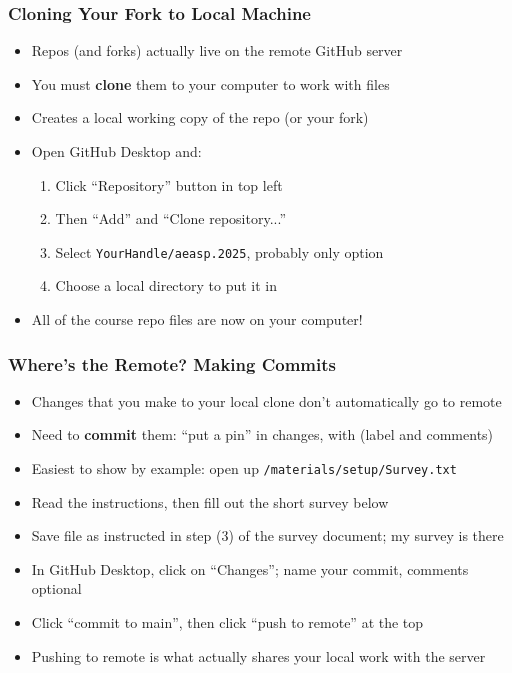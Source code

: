 \documentclass[aspectratio=169]{beamer}
\begin{document}

\begin{frame}
\frametitle{Cloning Your Fork to Local Machine}
\begin{itemize}
	\item Repos (and forks) actually live on the remote GitHub server
	
	\item You must \textbf{clone} them to your computer to work with files
	
	\item Creates a local working copy of the repo (or your fork)
	
	\item Open GitHub Desktop and:
	\begin{enumerate}
		\item Click ``Repository'' button in top left
		
		\item Then ``Add'' and ``Clone repository...''
		
		\item Select \texttt{YourHandle/aeasp.2025}, probably only option
		
		\item Choose a local directory to put it in
	\end{enumerate}

	\item All of the course repo files are now on your computer!
\end{itemize}
\end{frame}


\begin{frame}
\frametitle{Where's the Remote? Making Commits}
\begin{itemize}
	\item Changes that you make to your local clone don't automatically go to remote
	
	\item Need to \textbf{commit} them: ``put a pin'' in changes, with (label and comments)
	
	\item <2->Easiest to show by example: open up \texttt{/materials/setup/Survey.txt}
	
	\item <2->Read the instructions, then fill out the short survey below
	
	\item <2->Save file as instructed in step (3) of the survey document; my survey is there
	
	\item <3->In GitHub Desktop, click on ``Changes''; name your commit, comments optional
	
	\item <3->Click ``commit to main'', then click ``push to remote'' at the top
	
	\item <3->Pushing to remote is what actually shares your local work with the server
\end{itemize}
\end{frame}
\end{document}
